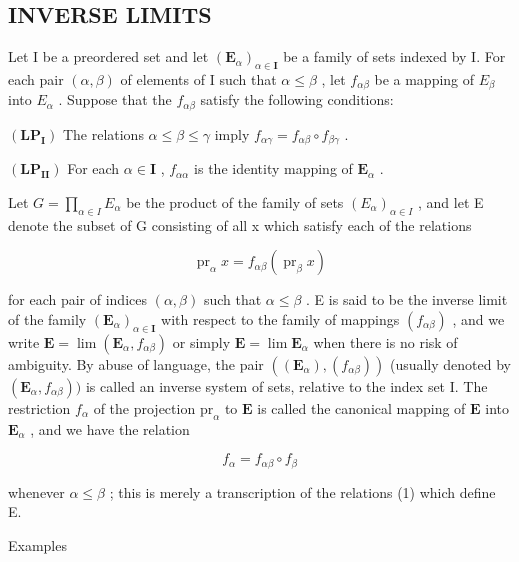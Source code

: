 \subsection{INVERSE LIMITS}

Let I be a preordered set and let \((\mathbf{E}_{\alpha})_{\alpha\in\mathbf{I}}\) be a family of sets indexed by I. For each pair \((\alpha,\beta)\) of elements of I such that \(\alpha\leqslant\beta\) , let \(f_{\alpha\beta}\) be a mapping of \(E_{\beta}\) into \(E_{\alpha}\) . Suppose that the \(f_{\alpha\beta}\) satisfy the following conditions:

\((\mathbf{LP}_{\mathbf{I}})\) The relations \(\alpha \leqslant \beta \leqslant \gamma\) imply \(f_{\alpha \gamma} = f_{\alpha \beta} \circ f_{\beta \gamma}\) .

\((\mathbf{LP}_{\mathbf{II}})\) For each \(\alpha \in \mathbf{I}\) , \(f_{\alpha \alpha}\) is the identity mapping of \(\mathbf{E}_{\alpha}\) .

Let \(G = \prod_{\alpha \in I} E_{\alpha}\) be the product of the family of sets \((E_{\alpha})_{\alpha \in I}\) , and let E denote the subset of G consisting of all x which satisfy each of the relations

\[
\operatorname{pr} _ {\alpha} x = f _ {\alpha \beta} (\operatorname{pr} _ {\beta} x)\tag{1}
\]

for each pair of indices \((\alpha, \beta)\) such that \(\alpha \leqslant \beta\) . E is said to be the inverse limit of the family \((\mathbf{E}_{\alpha})_{\alpha \in \mathbf{I}}\) with respect to the family of mappings \((f_{\alpha \beta})\) , and we write \(\mathbf{E} = \lim (\mathbf{E}_{\alpha}, f_{\alpha \beta})\) or simply \(\mathbf{E} = \lim \mathbf{E}_{\alpha}\) when there is no risk of ambiguity. By abuse of language, the pair \(((\mathbf{E}_{\alpha}), (f_{\alpha \beta}))\) (usually denoted by \((\mathbf{E}_{\alpha}, f_{\alpha \beta}))\) is called an inverse system of sets, relative to the index set I. The restriction \(f_{\alpha}\) of the projection \(\mathrm{pr}_{\alpha}\) to \(\mathbf{E}\) is called the canonical mapping of \(\mathbf{E}\) into \(\mathbf{E}_{\alpha}\) , and we have the relation

\[
f _ {\alpha} = f _ {\alpha \beta} \circ f _ {\beta}\tag{2}
\]

whenever \(\alpha \leqslant \beta\) ; this is merely a transcription of the relations (1) which define E.

Examples


